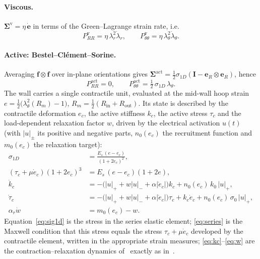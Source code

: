 \documentclass[11pt,a4paper]{article}
\newcommand{\bI}{\mathbf I}
\newcommand{\be}{\mathbf e}
\newcommand{\bfib}{\mathbf f}
\newcommand{\Rin}{R_{\mathrm{in}}}
\newcommand{\Rout}{R_{\mathrm{out}}}
\newcommand{\lt}{\lambda_\theta}
\newcommand{\lr}{\lambda_r}
\newcommand{\sig}{\sigma_{1D}}
\begin{document}
\paragraph{Viscous.}
$\boldsymbol\Sigma^{\mathrm v}=\eta\,\dot{\mathbf e}$ in terms of the Green--Lagrange strain rate, i.e.
\begin{equation}
  P_{RR}^{\mathrm v}=\eta\,\lr^2\dot\lr,\qquad
  P_{\theta\theta}^{\mathrm v}=\eta\,\lt^2\dot\lt .
  \label{eq:Pv_visc}
\end{equation}

\paragraph{Active: Bestel--Cl\'ement--Sorine.}
Averaging $\bfib\otimes\bfib$ over in-plane orientations gives $\boldsymbol\Sigma^{\mathrm{act}}=\tfrac12\sig(\bI-\be_R\otimes\be_R)$, hence
\begin{equation}
  P_{RR}^{\mathrm{act}}=0,\qquad
  P_{\theta\theta}^{\mathrm{act}}=\tfrac12\,\sig\,\lt .
  \label{eq:Pact}
\end{equation}
The wall carries a single contractile unit, evaluated at the mid-wall hoop strain $e=\tfrac12\big(\lt^2(R_m)-1\big)$, $R_m=\tfrac12(\Rin+\Rout)$. Its state is described by the contractile deformation $e_c$, the active stiffness $k_c$, the active stress $\tau_c$ and the load-dependent relaxation factor $w$, driven by the electrical activation $u(t)$ (with $|u|_\pm$ its positive and negative parts, $n_0(e_c)$ the recruitment function and $m_0(e_c)$ the relaxation target):
\begin{align}
  \sig&=\frac{E_s\,(e-e_c)}{(1+2e_c)^2}, \label{eq:sig1d}\\
  (\tau_c+\mu\dot e_c)(1+2e_c)^3&=E_s\,(e-e_c)(1+2e), \label{eq:series}\\
  \dot k_c&=-\big(|u|_++w|u|_-+\alpha|\dot e_c|\big)k_c+n_0(e_c)\,k_0\,|u|_+, \label{eq:kc}\\
  \dot\tau_c&=-\big(|u|_++w|u|_-+\alpha|\dot e_c|\big)\tau_c+k_c\dot e_c+n_0(e_c)\,\sigma_0\,|u|_+, \label{eq:tauc}\\
  \alpha_r\dot w&=m_0(e_c)-w . \label{eq:w}
\end{align}
Equation~\eqref{eq:sig1d} is the stress in the series elastic element; \eqref{eq:series} is the Maxwell condition that this stress equals the stress $\tau_c+\mu\dot e_c$ developed by the contractile element, written in the appropriate strain measures; \eqref{eq:kc}--\eqref{eq:w} are the contraction--relaxation dynamics of~\cite{Bestel2001} exactly as in~\cite{Caruel2014}.
\end{document}
